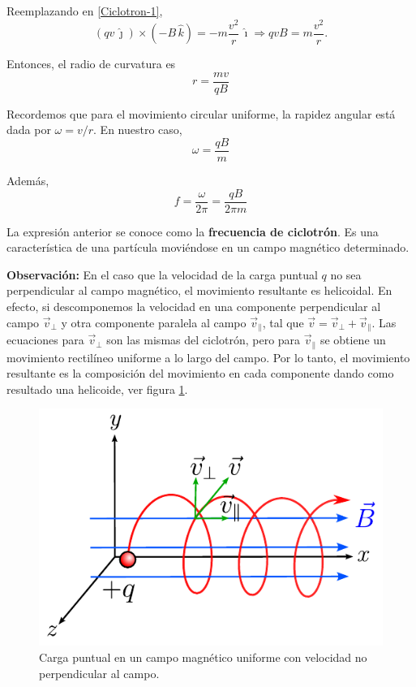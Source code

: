 \begin{ejemplo}[Ciclotrón]
Reemplazando en \eqref{Ciclotron-1},
$$(q v\,\hat{\jmath}) \times (-B \,\hat{k}) = - m \frac{v^2}{r} \,\hat{\imath} \Rightarrow qvB = m \frac{v^2}{r}.$$

Entonces, el radio de curvatura es
\begin{equation*}
\boxed{r = \frac{mv}{qB}}
\end{equation*}

Recordemos que para el movimiento circular uniforme, la rapidez angular está dada por $\omega = v/r$. En nuestro caso,
\begin{equation*}
\boxed{\omega = \frac{qB}{m}}
\end{equation*}

Además,
\begin{equation*}
\boxed{f = \frac{\omega}{2\pi} = \frac{qB}{2\pi m}}
\end{equation*}

La expresión anterior se conoce como la \textbf{frecuencia de ciclotrón}. Es una característica de una partícula moviéndose en un campo magnético determinado.

\textbf{Observación:} En el caso que la velocidad de la carga puntual $q$ no sea perpendicular al campo magnético, el movimiento resultante es helicoidal. En efecto, si descomponemos la velocidad en una componente perpendicular al campo $\Vec{v}_{\perp}$ y otra componente paralela al campo $\Vec{v}_{\parallel}$, tal que $\Vec{v} = \vec{v}_{\perp} + \Vec{v}_{\parallel}$. Las ecuaciones para $\Vec{v}_{\perp}$ son las mismas del ciclotrón, pero para $\Vec{v}_{\parallel}$ se obtiene un movimiento rectilíneo uniforme a lo largo del campo. Por lo tanto, el movimiento resultante es la composición del movimiento en cada componente dando como resultado una helicoide, ver figura \ref{fig:Helicoide}.

\begin{figure}[H]
    \centering
    \includegraphics[scale = 0.9]{Figuras/Helicoidal.pdf}
    \caption{Carga puntual en un campo magnético uniforme con velocidad no perpendicular al campo.}
    \label{fig:Helicoide}
\end{figure}
\end{ejemplo}

